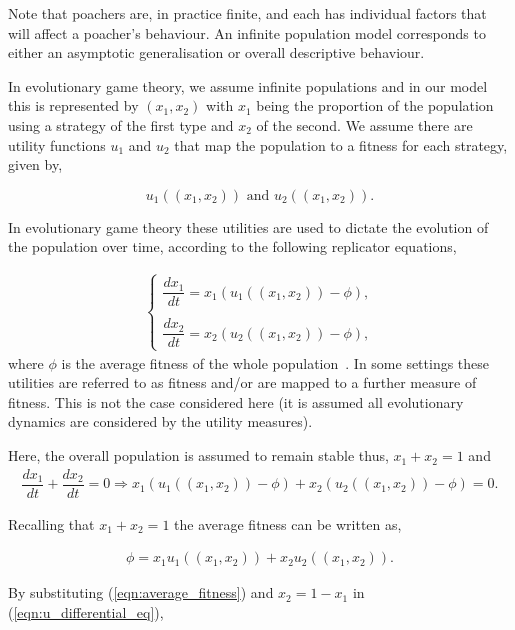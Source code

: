 \documentclass[10pt]{article}
\begin{document}
Note that poachers are, in practice finite, and each has individual factors that will
affect a poacher's behaviour. An infinite population model corresponds to either
an asymptotic generalisation or overall descriptive behaviour.

In evolutionary game theory, we assume infinite populations and in our
model this is represented by \((x_1, x_2)\) with \(x_1\) being the proportion
of the population using a strategy of the first type and \(x_2\) of the second. We
assume there are utility functions \(u_1\) and \(u_2\) that map the population
to a fitness for each strategy, given by,

\[ u_1((x_1, x_2))  \text{ and } u_2((x_1, x_2)).\]

In evolutionary game theory these utilities are used to dictate the evolution of
the population over time, according to the following replicator equations,

\begin{eqnarray}
    \label{eqn:u_differential_eq}
    \left\{
    \begin{array}{cl}
    \dfrac{dx_1}{dt}=x_1(u_1((x_1, x_2))-\phi),
    \\
    \\
    \dfrac{dx_2}{dt}= x_2(u_2((x_1, x_2))-\phi),
    \end{array} \right.
\end{eqnarray}
where \(\phi\) is the average fitness of the whole population~\cite{nowak2006evolutionary}.
In some settings these utilities are referred to as fitness and/or are mapped to
a further measure of fitness. This is not the case considered here (it is
assumed all evolutionary dynamics are considered by the utility measures).

Here, the overall
population is assumed to remain stable thus, \(x_1 + x_2 = 1 \) and
\begin{eqnarray}
    \dfrac{dx_1}{dt}  + \dfrac{dx_2}{dt} = 0 \Rightarrow x_1(u_1((x_1, x_2)) - \phi)
     + x_2(u_2((x_1, x_2)) - \phi)=0.
\end{eqnarray}

Recalling that \(x_1 + x_2 = 1\) the average fitness can be written as,

\begin{eqnarray}
\label{eqn:average_fitness}
    \phi=x_1u_1((x_1, x_2)) + x_2u_2((x_1, x_2)).
\end{eqnarray}

\noindent{} By substituting (\ref{eqn:average_fitness}) and \(x_2= 1 - x_1\)
in (\ref{eqn:u_differential_eq}),
\end{document}
